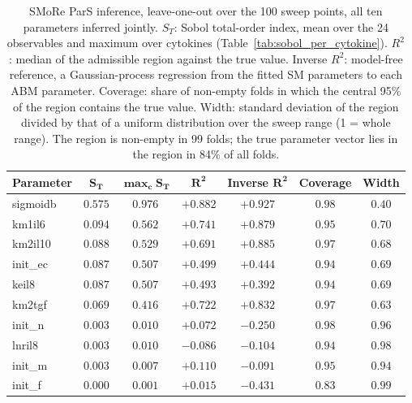 \begin{table}[!htbp]
\caption{SMoRe ParS inference, leave-one-out over the 100 sweep points, all ten parameters inferred jointly. $S_T$: Sobol total-order index, mean over the 24 observables and maximum over cytokines (Table~\ref{tab:sobol_per_cytokine}). $R^2$: median of the admissible region against the true value. Inverse $R^2$: model-free reference, a Gaussian-process regression from the fitted SM parameters to each ABM parameter. Coverage: share of non-empty folds in which the central 95\% of the region contains the true value. Width: standard deviation of the region divided by that of a uniform distribution over the sweep range (1 = whole range). The region is non-empty in 99 folds; the true parameter vector lies in the region in 84\% of all folds.}
\label{tab:recovery}
\centering\footnotesize
\setlength{\tabcolsep}{5pt}
\begin{tabular}{lcccccc}
\toprule
\textbf{Parameter} & $\mathbf{S_T}$ & $\mathbf{\max_c S_T}$ & $\mathbf{R^2}$ & \textbf{Inverse }$\mathbf{R^2}$ & \textbf{Coverage} & \textbf{Width} \\
\midrule
sigmoidb & $0.575$ & $0.976$ & $+0.882$ & $+0.927$ & $0.98$ & $0.40$ \\
km1il6 & $0.094$ & $0.562$ & $+0.741$ & $+0.879$ & $0.95$ & $0.70$ \\
km2il10 & $0.088$ & $0.529$ & $+0.691$ & $+0.885$ & $0.97$ & $0.68$ \\
init\_ec & $0.087$ & $0.507$ & $+0.499$ & $+0.444$ & $0.94$ & $0.69$ \\
keil8 & $0.087$ & $0.507$ & $+0.493$ & $+0.392$ & $0.94$ & $0.69$ \\
km2tgf & $0.069$ & $0.416$ & $+0.722$ & $+0.832$ & $0.97$ & $0.63$ \\
init\_n & $0.003$ & $0.010$ & $+0.072$ & $-0.250$ & $0.98$ & $0.96$ \\
lnril8 & $0.003$ & $0.010$ & $-0.086$ & $-0.104$ & $0.94$ & $0.98$ \\
init\_m & $0.003$ & $0.007$ & $+0.110$ & $-0.091$ & $0.95$ & $0.94$ \\
init\_f & $0.000$ & $0.001$ & $+0.015$ & $-0.431$ & $0.83$ & $0.99$ \\
\bottomrule
\end{tabular}
\end{table}
